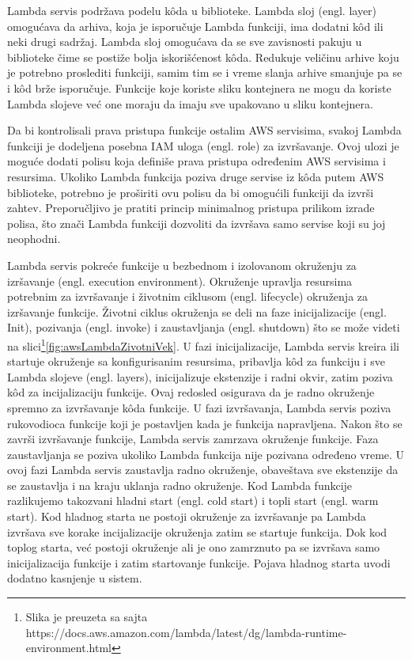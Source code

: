 \documentclass[12pt,oneside]{memoir}
\begin{document}
Lambda servis podržava podelu kôda u biblioteke. Lambda sloj (engl. layer) omogućava da arhiva, koja je isporučuje Lambda funkciji, ima dodatni kôd ili neki drugi sadržaj. Lambda sloj omogućava da se sve zavisnosti pakuju u biblioteke čime se postiže bolja iskorišćenost kôda. Redukuje veličinu arhive koju je potrebno proslediti funkciji, samim tim se i vreme slanja arhive smanjuje pa se i kôd brže isporučuje. Funkcije koje koriste sliku kontejnera ne mogu da koriste Lambda slojeve već one moraju da imaju sve upakovano u sliku kontejnera.

 
Da bi kontrolisali prava pristupa funkcije ostalim AWS servisima, svakoj Lambda funkciji je dodeljena posebna IAM uloga (engl. role) za izvršavanje. Ovoj ulozi je moguće dodati polisu koja definiše prava pristupa određenim AWS servisima i resursima. Ukoliko Lambda funkcija poziva druge servise iz kôda putem AWS biblioteke, potrebno je proširiti ovu polisu da bi omogućili funkciji da izvrši zahtev. Preporučljivo je pratiti princip minimalnog pristupa prilikom izrade polisa, što znači Lambda funkciji dozvoliti da izvršava samo servise koji su joj neophodni. 

 
Lambda servis pokreće funkcije u bezbednom i izolovanom okruženju za izršavanje (engl. execution environment). Okruženje upravlja resursima potrebnim za izvršavanje i životnim ciklusom (engl. lifecycle) okruženja za izršavanje funkcije. Životni ciklus okruženja se deli na faze inicijalizacije (engl. Init), pozivanja (engl. invoke) i zaustavljanja (engl. shutdown) što se može videti na slici\footnote{Slika je preuzeta sa sajta https://docs.aws.amazon.com/lambda/latest/dg/lambda-runtime-environment.html}\ref{fig:awsLambdaZivotniVek}. U fazi inicijalizacije, Lambda servis kreira ili startuje okruženje sa konfigurisanim resursima, pribavlja kôd za funkciju i sve Lambda slojeve (engl. layers), inicijalizuje ekstenzije i radni okvir, zatim poziva kôd za incijalizaciju funkcije. Ovaj redosled osigurava da je radno okruženje spremno za izvršavanje kôda funkcije. U fazi izvršavanja, Lambda servis poziva rukovodioca funkcije koji je postavljen kada je funkcija napravljena. Nakon što se završi izvršavanje funkcije, Lambda servis zamrzava okruženje funkcije. Faza zaustavljanja se poziva ukoliko Lambda funkcija nije pozivana određeno vreme. U ovoj fazi Lambda servis zaustavlja radno okruženje, obaveštava sve ekstenzije da se zaustavlja i na kraju uklanja radno okruženje. Kod Lambda funkcije razlikujemo takozvani hladni start (engl. cold start) i topli start (engl. warm start). Kod hladnog starta ne postoji okruženje za izvršavanje pa Lambda izvršava sve korake incijalizacije okruženja zatim se startuje funkcija. Dok kod toplog starta, već postoji okruženje ali je ono zamrznuto pa se izvršava samo inicijalizacija funkcije i zatim startovanje funkcije. Pojava hladnog starta uvodi dodatno kasnjenje u sistem. 
 
\end{document}
